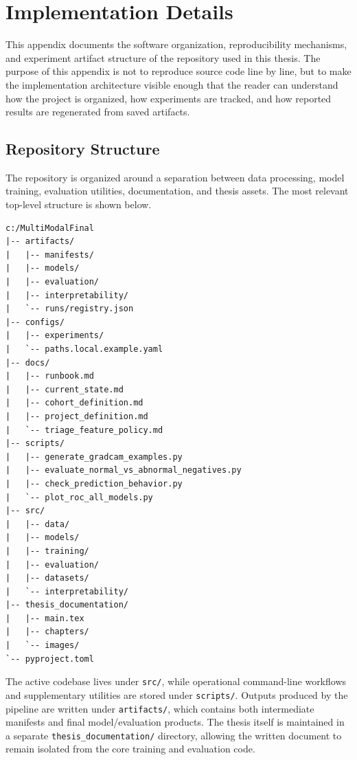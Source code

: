\chapter{Implementation Details}

This appendix documents the software organization, reproducibility mechanisms, and experiment artifact structure of the repository used in this thesis. The purpose of this appendix is not to reproduce source code line by line, but to make the implementation architecture visible enough that the reader can understand how the project is organized, how experiments are tracked, and how reported results are regenerated from saved artifacts.

\section{Repository Structure}

The repository is organized around a separation between data processing, model training, evaluation utilities, documentation, and thesis assets. The most relevant top-level structure is shown below.

\begin{verbatim}
c:/MultiModalFinal
|-- artifacts/
|   |-- manifests/
|   |-- models/
|   |-- evaluation/
|   |-- interpretability/
|   `-- runs/registry.json
|-- configs/
|   |-- experiments/
|   `-- paths.local.example.yaml
|-- docs/
|   |-- runbook.md
|   |-- current_state.md
|   |-- cohort_definition.md
|   |-- project_definition.md
|   `-- triage_feature_policy.md
|-- scripts/
|   |-- generate_gradcam_examples.py
|   |-- evaluate_normal_vs_abnormal_negatives.py
|   |-- check_prediction_behavior.py
|   `-- plot_roc_all_models.py
|-- src/
|   |-- data/
|   |-- models/
|   |-- training/
|   |-- evaluation/
|   |-- datasets/
|   `-- interpretability/
|-- thesis_documentation/
|   |-- main.tex
|   |-- chapters/
|   `-- images/
`-- pyproject.toml
\end{verbatim}

The active codebase lives under \texttt{src/}, while operational command-line workflows and supplementary utilities are stored under \texttt{scripts/}. Outputs produced by the pipeline are written under \texttt{artifacts/}, which contains both intermediate manifests and final model/evaluation products. The thesis itself is maintained in a separate \texttt{thesis\_documentation/} directory, allowing the written document to remain isolated from the core training and evaluation code.

